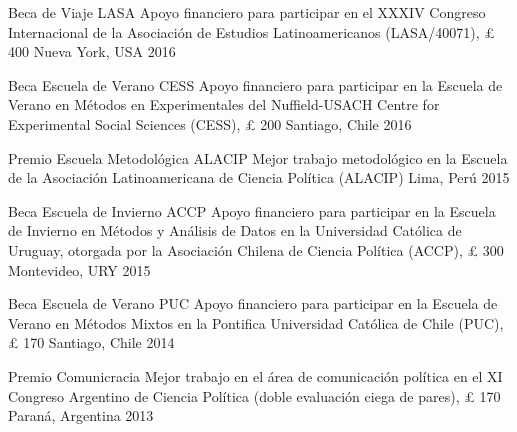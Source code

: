 \vspace{1mm}

\begin{cvhonors}
\cvhonor
{Beca de Viaje LASA} 
{Apoyo financiero para participar en el XXXIV Congreso Internacional de la Asociación de Estudios Latinoamericanos (LASA/40071), {\pounds} 400}
{Nueva York, USA}
{2016}
\end{cvhonors}

\vspace{1mm}

\begin{cvhonors}
\cvhonor
{Beca Escuela de Verano CESS}
{Apoyo financiero para participar en la Escuela de Verano en Métodos en Experimentales del Nuffield-USACH Centre for Experimental Social Sciences (CESS), {\pounds} 200}
{Santiago, Chile}
{2016}
\end{cvhonors}

\vspace{1mm}

\begin{cvhonors}
\cvhonor
{Premio Escuela Metodológica ALACIP}
{Mejor trabajo metodológico en la Escuela de la Asociación Latinoamericana de Ciencia Política (ALACIP)}
{Lima, Perú}
{2015}
\end{cvhonors}

\vspace{1mm}

\begin{cvhonors}
\cvhonor
{Beca Escuela de Invierno ACCP}
{Apoyo financiero para participar en la Escuela de Invierno en Métodos y Análisis de Datos en la Universidad Cat\'olica de Uruguay, otorgada por la Asociación Chilena de Ciencia Política (ACCP), {\pounds} 300}
{Montevideo, URY}
{ 2015}
\end{cvhonors}

\vspace{1mm}

\begin{cvhonors}
\cvhonor
{Beca Escuela de Verano PUC}
{Apoyo financiero para participar en la Escuela de Verano en Métodos Mixtos en la Pontifica Universidad Cat\'olica de Chile (PUC), {\pounds} 170}
{Santiago, Chile}
{2014} 
\end{cvhonors}

\vspace{1mm}

\begin{cvhonors}
\cvhonor
{Premio Comunicracia}
{Mejor trabajo en el área de comunicación política en el XI Congreso Argentino de Ciencia Política (doble evaluación ciega de pares), {\pounds} 170}
{Paraná, Argentina}
{2013}
\end{cvhonors}

